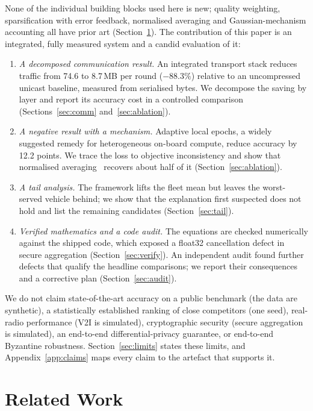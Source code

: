 \documentclass[journal]{IEEEtran}
\begin{document}
None of the individual building blocks used here is new; quality weighting, sparsification with error feedback, normalised averaging and Gaussian-mechanism accounting all have prior art (Section~\ref{sec:related}). The contribution of this paper is an integrated, fully measured system and a candid evaluation of it:
\begin{enumerate}
\item \emph{A decomposed communication result.} An integrated transport stack reduces traffic from 74.6 to 8.7\,MB per round ($-88.3\%$) relative to an uncompressed unicast baseline, measured from serialised bytes. We decompose the saving by layer and report its accuracy cost in a controlled comparison (Sections~\ref{sec:comm} and~\ref{sec:ablation}).
\item \emph{A negative result with a mechanism.} Adaptive local epochs, a widely suggested remedy for heterogeneous on-board compute, reduce accuracy by 12.2 points. We trace the loss to objective inconsistency and show that normalised averaging~\cite{wang2020fednova} recovers about half of it (Section~\ref{sec:ablation}).
\item \emph{A tail analysis.} The framework lifts the fleet mean but leaves the worst-served vehicle behind; we show that the explanation first suspected does not hold and list the remaining candidates (Section~\ref{sec:tail}).
\item \emph{Verified mathematics and a code audit.} The equations are checked numerically against the shipped code, which exposed a float32 cancellation defect in secure aggregation (Section~\ref{sec:verify}). An independent audit found further defects that qualify the headline comparisons; we report their consequences and a corrective plan (Section~\ref{sec:audit}).
\end{enumerate}

We do not claim state-of-the-art accuracy on a public benchmark (the data are synthetic), a statistically established ranking of close competitors (one seed), real-radio performance (V2I is simulated), cryptographic security (secure aggregation is simulated), an end-to-end differential-privacy guarantee, or end-to-end Byzantine robustness. Section~\ref{sec:limits} states these limits, and Appendix~\ref{app:claims} maps every claim to the artefact that supports it.

\section{Related Work}\label{sec:related}
\end{document}
